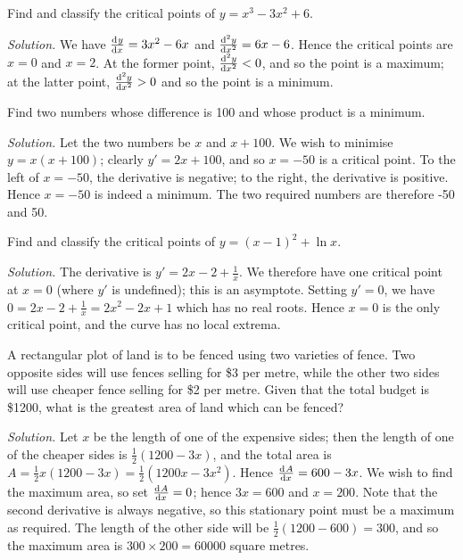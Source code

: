 \begin{ex}
  Find and classify the critical points of $ y = x^3 - 3x^2 + 6 $.

  \textit{Solution.} We have $ \od{y}{x} = 3x^2 - 6x $ and $ \od[2]{y}{x} = 6x - 6 $. Hence
                     the critical points are $ x = 0 $ and $ x = 2 $. At the former point, $ \od[2]{y}{x} < 0 $,
                     and so the point is a maximum; at the latter point, $ \od[2]{y}{x} > 0 $ and so the point is
                     a minimum.
\end{ex}

\begin{ex}
  Find two numbers whose difference is 100 and whose product is a minimum.

  \textit{Solution.} Let the two numbers be $ x $ and $ x + 100 $. We wish to minimise $ y = x(x + 100) $;
  clearly $ y' = 2x + 100 $, and so $ x = -50 $ is a critical point. To the left of $ x = -50 $, the derivative
  is negative; to the right, the derivative is positive. Hence $ x = -50 $ is indeed a minimum. The two required
  numbers are therefore -50 and 50.
\end{ex}

\begin{ex}
  Find and classify the critical points of $ y = (x - 1)^2 + \ln x $.

  \textit{Solution.} The derivative is $ y' = 2x - 2 + \frac{1}{x} $. We therefore have one critical
  point at $ x = 0 $ (where $ y' $ is undefined); this is an asymptote.
  Setting $ y' = 0 $, we have $ 0 = 2x - 2 + \frac{1}{x} = 2x^2 - 2x + 1 $ which has no real roots. Hence $ x = 0 $ is
  the only critical point, and the curve has no local extrema.
\end{ex}

\begin{ex}
  A rectangular plot of land is to be fenced using two varieties of fence. Two opposite sides will
  use fences selling for \$3 per metre, while the other two sides will use cheaper fence selling for \$2 per metre.
  Given that the total budget is \$1200, what is the greatest area of land which can be fenced?

  \textit{Solution.} Let $ x $ be the length of one of the expensive sides; then the length of one of the cheaper
                    sides is $ \frac{1}{2}(1200 - 3x) $, and the total area is $ A = \frac{1}{2} x (1200 - 3x) = \frac{1}{2}(1200x - 3x^2) $.
                    Hence $ \od{A}{x} = 600 - 3x $. We wish to find the maximum area, so set $ \od{A}{x} = 0 $; hence $ 3x = 600 $ and $ x = 200 $.
                    Note that the second derivative is always negative, so this stationary point must be a maximum as required. The length
                    of the other side will be $ \frac{1}{2}(1200 - 600) = 300 $, and so the maximum area is $ 300 \times 200 = 60000 $ square metres.
\end{ex}

